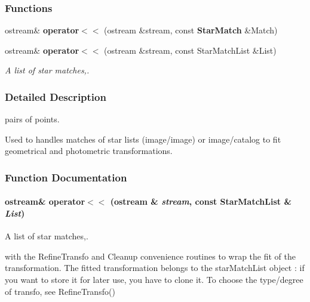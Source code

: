 \subsubsection*{Functions}
\begin{CompactItemize}
\item 
{}
ostream\& {\bf operator$<$$<$} (ostream \&stream, const {\bf Star\-Match} \&Match)\label{starmatch_h_a2}

\item 
ostream\& {\bf operator$<$$<$} (ostream \&stream, const Star\-Match\-List \&List)
\begin{CompactList}\small\item\em A list of star matches,.\item\end{CompactList}\end{CompactItemize}


\subsubsection{Detailed Description}
pairs of points.

 Used to handles matches of star lists (image/image) or image/catalog to fit geometrical and photometric transformations.



\subsubsection{Function Documentation}
\paragraph{\setlength{\rightskip}{0pt plus 5cm}ostream\& operator$<$$<$ (ostream \& {\em stream}, const Star\-Match\-List \& {\em List})}\hfill\label{starmatch_h_a3}


A list of star matches,.

with the Refine\-Transfo and Cleanup convenience routines  to wrap the fit of the transformation. The fitted transformation belongs to the star\-Match\-List object : if you want to store it for later  use, you have to clone it. To choose the type/degree of transfo, see Refine\-Transfo() 